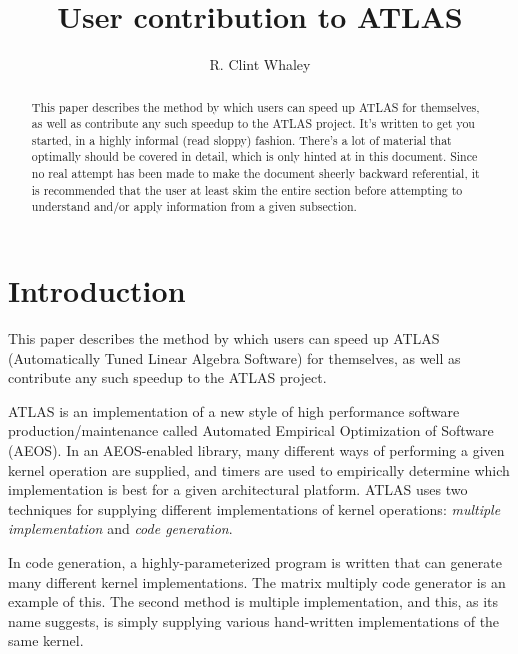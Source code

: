 \documentclass[11pt]{article}
\begin{document}
\begin{titlepage}
\title{User contribution to ATLAS}
\vspace{.4in}
\author
{
 R. Clint Whaley
}
\end{titlepage}
\maketitle

\begin{abstract}
This paper describes the method by which users can speed up ATLAS for
themselves, as well as contribute any such speedup to the ATLAS project.
It's written to get you started, in a highly informal (read sloppy)
fashion.  There's a lot of material that optimally should be covered
in detail, which is only hinted at in this document.  Since no real
attempt has been made to make the document sheerly backward referential,
it is recommended that the user at least skim the entire section before
attempting to understand and/or apply information from a given
subsection.
\end{abstract}

\newpage
\tableofcontents

\newpage

\section{Introduction}

This paper describes the method by which users can speed up ATLAS
(Automatically Tuned Linear Algebra Software) for themselves, as well
as contribute any such speedup to the ATLAS project.

ATLAS is an implementation of a new style of high performance software
production/maintenance called Automated Empirical Optimization of Software
(AEOS).  In an AEOS-enabled library, many different ways of performing
a given kernel operation are supplied, and timers are used to empirically
determine which implementation is best for a given architectural platform.
ATLAS uses two techniques for supplying different implementations of kernel
operations: {\em multiple implementation} and {\em code generation}.

In code generation, a highly-parameterized program is written that can
generate many different kernel implementations.  The matrix multiply
code generator is an example of this.  The second method is multiple
implementation, and this, as its name suggests, is simply supplying
various hand-written implementations of the same kernel.
\end{document}
